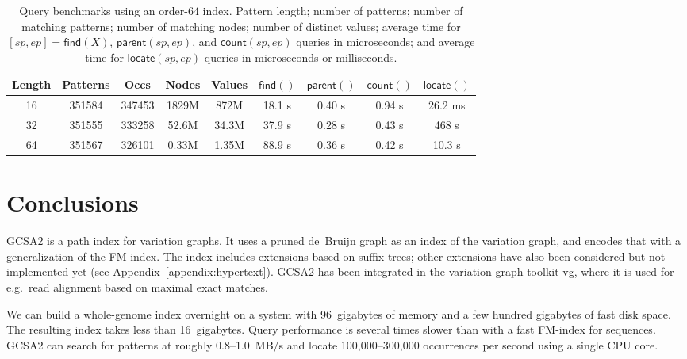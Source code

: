 \documentclass[a4paper,UKenglish]{lipics-v2016}
\newcommand{\find}{\ensuremath{\mathsf{find}}}
\newcommand{\locate}{\ensuremath{\mathsf{locate}}}
\newcommand{\parent}{\ensuremath{\mathsf{parent}}}
\newcommand{\countq}{\ensuremath{\mathsf{count}}}
\newcommand{\orderk}[1]{order\nobreakdash-$#1$}
\begin{document}
\begin{table}[t!]
\begin{center}
\caption{Query benchmarks using an \orderk{64} index. Pattern length; number of patterns; number of matching patterns; number of matching nodes; number of distinct values; average time for $[sp, ep] = \find(X)$, $\parent(sp, ep)$, and $\countq(sp, ep)$ queries in microseconds; and average time for $\locate(sp, ep)$ queries in microseconds or milliseconds.}\label{table:benchmark}
\begin{tabular}{c|cc|cc|cccc}
\hline
\textbf{Length} & \textbf{Patterns} & \textbf{Occs} & \textbf{Nodes} & \textbf{Values} & $\find()$ & $\parent()$ & $\countq()$ & $\locate()$ \\
\hline
16 & 351584 & 347453 & 1829M &  872M & 18.1 \textmu{}s & 0.40 \textmu{}s & 0.94 \textmu{}s & 26.2 ms \\
32 & 351555 & 333258 & 52.6M & 34.3M & 37.9 \textmu{}s & 0.28 \textmu{}s & 0.43 \textmu{}s & 468 \textmu{}s \\
64 & 351567 & 326101 & 0.33M & 1.35M & 88.9 \textmu{}s & 0.36 \textmu{}s & 0.42 \textmu{}s & 10.3 \textmu{}s \\
\hline
\end{tabular}
\end{center}
\end{table}


\section{Conclusions}

GCSA2 is a path index for variation graphs. It uses a pruned de~Bruijn graph as an index of the variation graph, and encodes that with a generalization of the FM\nobreakdash-index. The index includes extensions based on suffix trees; other extensions have also been considered but not implemented yet (see Appendix~\ref{appendix:hypertext}). GCSA2 has been integrated in the variation graph toolkit vg, where it is used for e.g.~read alignment based on maximal exact matches.

We can build a whole-genome index overnight on a system with 96~gigabytes of memory and a few hundred gigabytes of fast disk space. The resulting index takes less than 16~gigabytes. Query performance is several times slower than with a fast FM\nobreakdash-index for sequences. GCSA2 can search for patterns at roughly 0.8\nobreakdash--1.0~MB/s and locate 100,000\nobreakdash--300,000 occurrences per second using a single CPU core.
\end{document}
